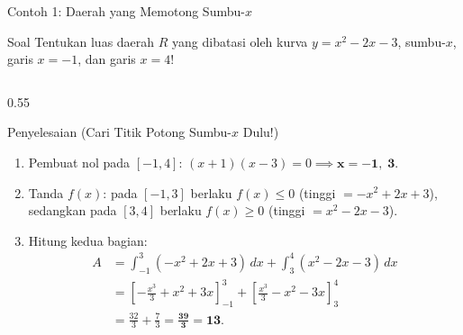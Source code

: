 \documentclass[aspectratio=43,10pt]{beamer}
\begin{document}
\begin{frame}{Contoh 1: Daerah yang Memotong Sumbu-$x$}
    \begin{exampleblock}{Soal}
        \scriptsize
        Tentukan luas daerah $R$ yang dibatasi oleh kurva $y = x^2 - 2x - 3$, sumbu-$x$, garis $x = -1$, dan garis $x = 4$!
    \end{exampleblock}

    \begin{columns}[c]
        \begin{column}{0.55\textwidth}
            \begin{block}{Penyelesaian (Cari Titik Potong Sumbu-$x$ Dulu!)}
                \scriptsize\abovedisplayskip=2pt\belowdisplayskip=2pt
                \begin{enumerate}\itemsep=1pt
                    \item Pembuat nol pada $[-1, 4]$: $(x + 1)(x - 3) = 0 \implies \mathbf{x = -1, \;3}$.
                    \item Tanda $f(x)$: pada $[-1, 3]$ berlaku $f(x) \le 0$ (tinggi $= -x^2 + 2x + 3$), sedangkan pada $[3, 4]$ berlaku $f(x) \ge 0$ (tinggi $= x^2 - 2x - 3$).
                    \item Hitung kedua bagian:
                    \begin{align*}
                        A &= \int_{-1}^{3} (-x^2 + 2x + 3)\,dx + \int_{3}^{4} (x^2 - 2x - 3)\,dx\\
                        &= \left[-\frac{x^3}{3} + x^2 + 3x\right]_{-1}^{3} + \left[\frac{x^3}{3} - x^2 - 3x\right]_{3}^{4}\\
                        &= \frac{32}{3} + \frac{7}{3} = \mathbf{\frac{39}{3} = 13}.
                    \end{align*}
                \end{enumerate}
            \end{block}
        \end{column}


\end{columns}
\end{frame}
\end{document}
